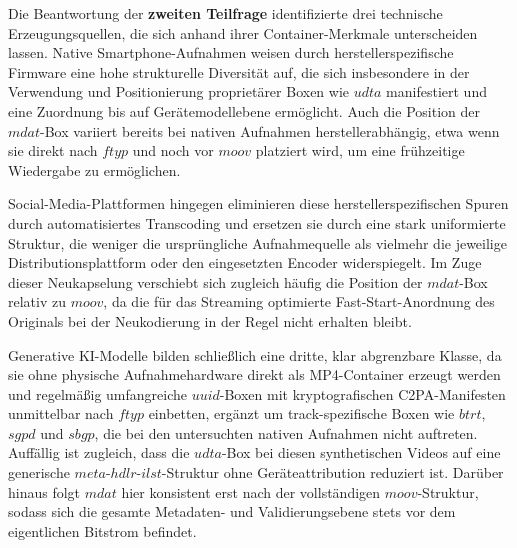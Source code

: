 Die Beantwortung der \textbf{zweiten Teilfrage} identifizierte drei technische Erzeugungsquellen, die sich anhand ihrer Container-Merkmale unterscheiden lassen. Native Smartphone-Aufnahmen weisen durch herstellerspezifische Firmware eine hohe strukturelle Diversität auf, die sich insbesondere in der Verwendung und Positionierung proprietärer Boxen wie \(udta\) manifestiert und eine Zuordnung bis auf Gerätemodellebene ermöglicht. Auch die Position der \(mdat\)-Box variiert bereits bei nativen Aufnahmen herstellerabhängig, etwa wenn sie direkt nach \(ftyp\) und noch vor \(moov\) platziert wird, um eine frühzeitige Wiedergabe zu ermöglichen.

Social-Media-Plattformen hingegen eliminieren diese herstellerspezifischen Spuren durch automatisiertes Transcoding und ersetzen sie durch eine stark uniformierte Struktur, die weniger die ursprüngliche Aufnahmequelle als vielmehr die jeweilige Distributionsplattform oder den eingesetzten Encoder widerspiegelt. Im Zuge dieser Neukapselung verschiebt sich zugleich häufig die Position der \(mdat\)-Box relativ zu \(moov\), da die für das Streaming optimierte Fast-Start-Anordnung des Originals bei der Neukodierung in der Regel nicht erhalten bleibt.

Generative KI-Modelle bilden schließlich eine dritte, klar abgrenzbare Klasse, da sie ohne physische Aufnahmehardware direkt als MP4-Container erzeugt werden und regelmäßig umfangreiche \(uuid\)-Boxen mit kryptografischen C2PA-Manifesten unmittelbar nach \(ftyp\) einbetten, ergänzt um track-spezifische Boxen wie \(btrt\), \(sgpd\) und \(sbgp\), die bei den untersuchten nativen Aufnahmen nicht auftreten. Auffällig ist zugleich, dass die \(udta\)-Box bei diesen synthetischen Videos auf eine generische \(meta\)-\(hdlr\)-\(ilst\)-Struktur ohne Geräteattribution reduziert ist. Darüber hinaus folgt \(mdat\) hier konsistent erst nach der vollständigen \(moov\)-Struktur, sodass sich die gesamte Metadaten- und Validierungsebene stets vor dem eigentlichen Bitstrom befindet.\\


